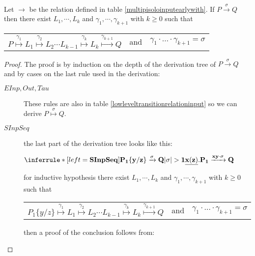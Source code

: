 \begin{proposition}\label{equivalencehightolowinput}
  Let $\rightarrow$ be the relation defined in table \ref{multipisoloinputearlywith}. If $P\xrightarrow{\sigma} Q$ then there exist $L_{1}, \cdots, L_{k}$ and $\gamma_{1}, \cdots, \gamma_{k+1}$ with $k\geq 0$ such that 
  \begin{center}
    \begin{tabular}{lll}
      $P \stackrel{\gamma_{1}}{\longmapsto} L_{1}  \stackrel{\gamma_{2}}{\longmapsto} L_{2} \cdots L_{k-1} \stackrel{\gamma_{k}}{\longmapsto} L_{k} \stackrel{\gamma_{k+1}}{\longmapsto} Q$ 
    &
      and
    &
      $\gamma_{1} \cdot \ldots \cdot \gamma_{k+1} = \sigma$  
    \end{tabular}
  \end{center}
  \begin{proof}
    The proof is by induction on the depth of the derivation tree of $P\xrightarrow{\sigma} Q$ and by cases on the last rule used in the derivation:
    \begin{description}
      \item[$EInp, Out, Tau$]
	These rules are also in table \ref{lowleveltransitionrelationinput} so we can derive $P \stackrel{\sigma}{\longmapsto}Q$.
      \item[$SInpSeq$]
	    the last part of the derivation tree looks like this:
	    \begin{center}
	      $\inferrule* [left=\bf{SInpSeq}]{
		  P_{1}\{y/z\} \xrightarrow{\sigma} Q
		\\
		  |\sigma|>1
	      }{
		\underline{x(z)}.P_{1} \xrightarrow{xy \cdot \sigma} Q
	      }$	      
	    \end{center}
	    for inductive hypothesis there exist $L_{1}, \cdots, L_{k}$ and $\gamma_{1}, \cdots, \gamma_{k+1}$ with $k\geq 0$ such that 
	    \begin{center}
	      \begin{tabular}{lll}
		$P_{1}\{y/z\} \stackrel{\gamma_{1}}{\longmapsto} L_{1} \stackrel{\gamma_{2}}{\longmapsto} L_{2} \cdots L_{k-1} \stackrel{\gamma_{k}}{\longmapsto} L_{k} \stackrel{\gamma_{k+1}}{\longmapsto} Q$ 
	      &
		and
	      &
		$\gamma_{1} \cdot \ldots \cdot \gamma_{k+1} = \sigma$
	      \end{tabular}
	    \end{center}
	    then a proof of the conclusion follows from:
	    \begin{center}
\end{center}
\end{description}
\end{proof}
\end{proposition}
